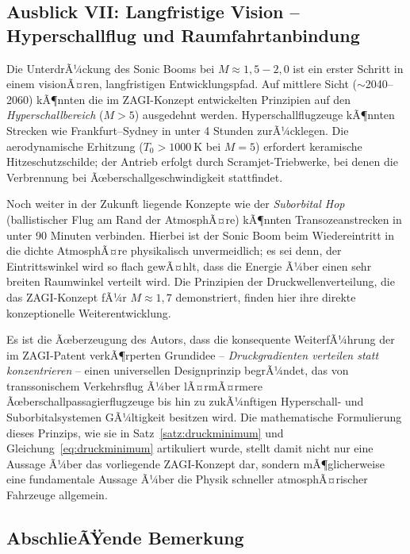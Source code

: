 ﻿\documentclass[12pt,a4paper]{article}
\theoremstyle{definition}
\theoremstyle{remark}
\begin{document}
\subsection{Ausblick VII: Langfristige Vision -- Hyperschallflug und Raumfahrtanbindung}
\label{sec:ausblick_hyperschall}

Die UnterdrÃ¼ckung des Sonic Booms bei $M \approx 1{,}5{-}2{,}0$ ist ein erster Schritt
in einem visionÃ¤ren, langfristigen Entwicklungspfad. Auf mittlere Sicht ($\sim$2040--2060)
kÃ¶nnten die im ZAGI-Konzept entwickelten Prinzipien auf den \emph{Hyperschallbereich}
($M > 5$) ausgedehnt werden. Hyperschallflugzeuge kÃ¶nnten Strecken wie
Frankfurt--Sydney in unter 4 Stunden zurÃ¼cklegen. Die aerodynamische Erhitzung
($T_0 > \SI{1000}{\kelvin}$ bei $M = 5$) erfordert keramische Hitzeschutzschilde;
der Antrieb erfolgt durch Scramjet-Triebwerke, bei denen die Verbrennung bei
Ãœberschallgeschwindigkeit stattfindet.

Noch weiter in der Zukunft liegende Konzepte wie der \emph{Suborbital Hop}
(ballistischer Flug am Rand der AtmosphÃ¤re) kÃ¶nnten Transozeanstrecken in
unter 90 Minuten verbinden. Hierbei ist der Sonic Boom beim Wiedereintritt
in die dichte AtmosphÃ¤re physikalisch unvermeidlich; es sei denn, der Eintrittswinkel
wird so flach gewÃ¤hlt, dass die Energie Ã¼ber einen sehr breiten Raumwinkel verteilt wird.
Die Prinzipien der Druckwellenverteilung, die das ZAGI-Konzept fÃ¼r $M \approx 1{,}7$
demonstriert, finden hier ihre direkte konzeptionelle Weiterentwicklung.

Es ist die Ãœberzeugung des Autors, dass die konsequente WeiterfÃ¼hrung der im
ZAGI-Patent verkÃ¶rperten Grundidee -- \emph{Druckgradienten verteilen statt
konzentrieren} -- einen universellen Designprinzip begrÃ¼ndet, das von
transsonischem Verkehrsflug Ã¼ber lÃ¤rmÃ¤rmere Ãœberschallpassagierflugzeuge bis
hin zu zukÃ¼nftigen Hyperschall- und Suborbitalsystemen GÃ¼ltigkeit besitzen wird.
Die mathematische Formulierung dieses Prinzips, wie sie in Satz~\ref{satz:druckminimum}
und Gleichung~\eqref{eq:druckminimum} artikuliert wurde, stellt damit nicht nur eine
Aussage Ã¼ber das vorliegende ZAGI-Konzept dar, sondern mÃ¶glicherweise eine fundamentale
Aussage Ã¼ber die Physik schneller atmosphÃ¤rischer Fahrzeuge allgemein.

\subsection{AbschlieÃŸende Bemerkung}
\label{sec:abschluss}
\end{document}
